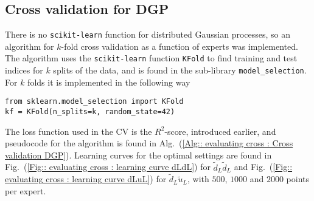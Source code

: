 \documentclass[twoside,english]{uiofysmaster}
\begin{document}

\subsection{Cross validation for DGP}

There is no \verb|scikit-learn| function for distributed Gaussian processes, so an algorithm for $k$-fold cross validation as a function of experts was implemented. The algorithm uses the \verb|scikit-learn| function \verb|KFold| to find training and test indices for $k$ splits of the data, and is found in the sub-library \verb|model_selection|. For $k$ folds it is implemented in the following way
\begin{lstlisting}
from sklearn.model_selection import KFold
kf = KFold(n_splits=k, random_state=42)
\end{lstlisting}
The loss function used in the CV is the $R^2$-score, introduced earlier, and pseudocode for the algorithm is found in Alg.\ (\ref{Alg:: evaluating cross : Cross validation DGP}). Learning curves for the optimal settings are found in Fig.\ (\ref{Fig:: evaluating cross : learning curve dLdL}) for $\tilde{d}_L \tilde{d}_L$ and Fig.\ (\ref{Fig:: evaluating cross : learning curve dLuL}) for $\tilde{d}_L \tilde{u}_L$, with $500$, $1000$ and $2000$ points per expert.
\end{document}
